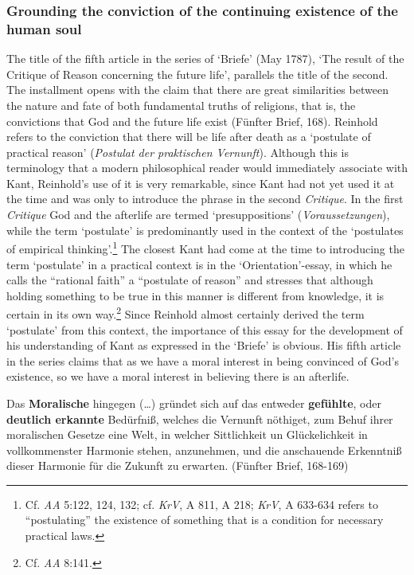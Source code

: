 \subsubsection{Grounding the conviction of the continuing existence of the human soul}


The title of the fifth article in the series of `Briefe' (May 1787), `The result of the Critique of Reason concerning the future life', parallels the title of the second. The installment opens with the claim that there are great similarities between the nature and fate of both fundamental truths of religions, that is, the convictions that God and the future life exist (F\"{u}nfter Brief, 168). Reinhold refers to the conviction that there will be life after death as a `postulate of practical reason' (\textit{Postulat der praktischen Vernunft}). Although this is terminology that a modern philosophical reader would immediately associate with Kant, Reinhold's use of it is very remarkable, since Kant had not yet used it at the time and was only to introduce the phrase in the second \textit{Critique}. In the first \textit{Critique} God and the afterlife are termed `presuppositions' (\textit{Voraussetzungen}), while the term `postulate' is predominantly used in the context of the `postulates of empirical thinking'.\footnote{ Cf. \textit{AA} 5:122, 124, 132; cf. \textit{KrV}, A 811, A 218; \textit{KrV}, A 633{-}634 refers to ``postulating'' the existence of something that is a condition for necessary practical laws. } The closest Kant had come at the time to introducing the term `postulate' in a practical context is in the `Orientation'{-}essay, in which he calls the ``rational faith'' a ``postulate of reason'' and stresses that although holding something to be true in this manner is different from knowledge, it is certain in its own way.\footnote{ Cf. \textit{AA} 8:141. } Since Reinhold almost certainly derived the term `postulate' from this context, the importance of this essay for the development of his understanding of Kant as expressed in the `Briefe' is obvious. His fifth article in the series claims that as we have a moral interest in being convinced of God's existence, so we have a moral interest in believing there is an afterlife. 

Das \textbf{Moralische} hingegen (\ldots ) gr\"{u}ndet sich auf das entweder \textbf{gef\"{u}hlte}, oder \textbf{deutlich erkannte }Bed\"{u}rfni\ss{}, welches die Vernunft n\"{o}thiget, zum Behuf ihrer moralischen Gesetze eine Welt, in welcher Sittlichkeit un Gl\"{u}ckelichkeit in vollkommenster Harmonie stehen, anzunehmen, und die anschauende Erkenntni\ss{} dieser Harmonie f\"{u}r die Zukunft zu erwarten. (F\"{u}nfter Brief, 168{-}169)

